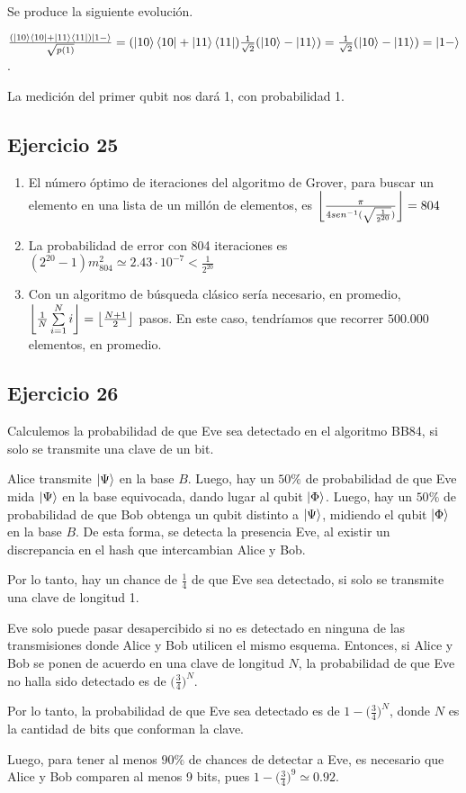 \documentclass[a4paper,11pt]{article}
\begin{document}
Se produce la siguiente evolución.

$\frac{(\ket{10}\bra{10} + \ket{11}\bra{11})\ket{1-}}{\sqrt{p(1)}} =  (\ket{10}\bra{10} + \ket{11}\bra{11}) \frac{1}{\sqrt{2}} (\ket{10} -\ket{11}) = 
\frac{1}{\sqrt{2}} (\ket{10} - \ket{11}) = \ket{1-}$.

La medición del primer qubit nos dará 1, con probabilidad 1.


\subsection*{Ejercicio 25}

\begin{enumerate}[label=\alph*)]
\item El número óptimo de iteraciones del algoritmo de Grover, para buscar un elemento en una lista de un millón de elementos, es
$\floor*{\frac{\pi}{4sen^{-1}(\sqrt{\frac{1}{2^{20}}})}} = 804$
\item La probabilidad de error con 804 iteraciones es $(2^{20}-1)m_{804}^{2} \simeq 2.43 \cdot 10^{-7} < \frac{1}{2^{20}}$
\item Con un algoritmo de búsqueda clásico sería necesario, en promedio, $\floor*{\frac{1}{N} \sum\limits_{i=1}^{N} i} = \floor*{\frac{N+1}{2}}$
pasos. En este caso, tendríamos que recorrer $500.000$ elementos, en promedio.
\end{enumerate}


\subsection*{Ejercicio 26}

Calculemos la probabilidad de que Eve sea detectado en el algoritmo BB84, si solo se transmite una clave de un bit.

Alice transmite $\ket{\Psi}$ en la base $B$. Luego, hay un $50\%$ de probabilidad de que Eve mida $\ket{\Psi}$ en
la base equivocada, dando lugar al qubit $\ket{\Phi}$. Luego, hay un $50\%$ de probabilidad de que Bob obtenga un qubit
distinto a $\ket{\Psi}$, midiendo el qubit $\ket{\Phi}$ en la base $B$. 
De esta forma, se detecta la presencia Eve, al existir un discrepancia en el hash que intercambian Alice y Bob.

Por lo tanto, hay un chance de $\frac{1}{4}$ de que Eve sea detectado, si solo se transmite una clave de longitud 1.

Eve solo puede pasar desapercibido si no es detectado en ninguna de las transmisiones donde Alice y Bob utilicen el mismo
esquema. 
Entonces, si Alice y Bob se ponen de acuerdo en una clave de longitud $N$, la probabilidad de que Eve no halla sido detectado es 
de $\big( \frac{3}{4} \big)^N$.

Por lo tanto, la probabilidad de que Eve sea detectado es de $1 - \big( \frac{3}{4} \big)^N$, donde $N$ es la cantidad de bits
que conforman la clave.  

Luego, para tener al menos $90 \%$ de chances de detectar a Eve, es necesario que Alice y Bob comparen al menos 9 bits,
pues $1 - \big( \frac{3}{4} \big)^9 \simeq 0.92$.
\end{document}
